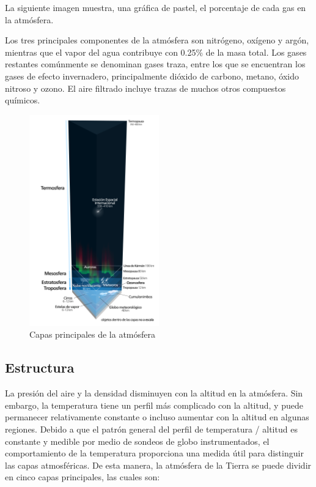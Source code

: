 \documentclass{article} %
\begin{document}
La siguiente imagen muestra, una gráfica de pastel, el porcentaje de cada gas en la atmósfera.


Los tres principales componentes de la atmósfera son nitrógeno, oxígeno y argón, mientras que el vapor del agua contribuye con 0.25\% de la masa total.
Los gases restantes comúnmente se denominan gases traza, entre los que se encuentran los gases de efecto invernadero, principalmente dióxido de carbono, metano, óxido nitroso y ozono. El aire filtrado incluye trazas de muchos otros compuestos químicos.

\begin{figure}
  \centering
  \includegraphics[width=0.5\textwidth]{Estrectura.png}
  \caption{Capas principales de la atmósfera}
  \label{fig:estructura}
\end{figure}



\subsection{Estructura}

La presión del aire y la densidad disminuyen con la altitud en la atmósfera. Sin embargo, la temperatura tiene un perfil más complicado con la altitud, y puede permanecer relativamente constante o incluso aumentar con la altitud en algunas regiones. Debido a que el patrón general del perfil de temperatura / altitud es constante y medible por medio de sondeos de globo instrumentados, el comportamiento de la temperatura proporciona una medida útil para distinguir las capas atmosféricas. De esta manera, la atmósfera de la Tierra se puede dividir en cinco capas principales, las cuales son:
\end{document}
